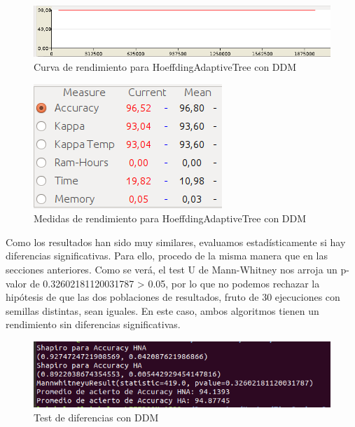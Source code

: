 \begin{figure}[H] %
	\centering
	\includegraphics[scale=0.5]{graph52.png}  %
	\caption{Curva de rendimiento para HoeffdingAdaptiveTree con DDM} 
	\label{fig:graph52}
\end{figure}

\begin{figure}[H] %
	\centering
	\includegraphics[scale=0.5]{measures52.png}  %
	\caption{Medidas de rendimiento para HoeffdingAdaptiveTree con DDM} 
	\label{fig:measure52}
\end{figure}

Como los resultados han sido muy similares, evaluamos estadísticamente si hay diferencias significativas. Para ello, procedo de la misma manera que en las secciones anteriores. Como se verá, el test U de Mann-Whitney nos arroja un p-valor de 
0.32602181120031787 > 0.05, por lo que no podemos rechazar la hipótesis de que las dos poblaciones de resultados, fruto de 30 ejecuciones con semillas distintas, sean iguales. En este caso, ambos algoritmos tienen un rendimiento sin diferencias significativas.

\begin{figure}[H] %
	\centering
	\includegraphics[scale=0.5]{test5.png}  %
	\caption{Test de diferencias con DDM} 
	\label{fig:test5}
\end{figure}

